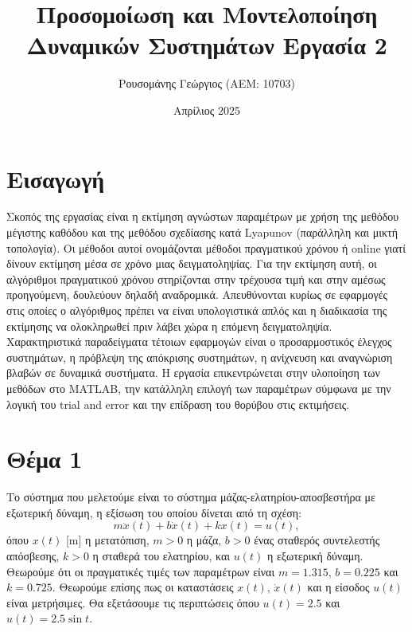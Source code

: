 \documentclass[a4paper,12pt]{article}
\title{Προσομοίωση και Μοντελοποίηση \newline Δυναμικών Συστημάτων \newline Εργασία 2}
\author{Ρουσομάνης Γεώργιος (ΑΕΜ: 10703)}
\date{Απρίλιος 2025}
\begin{document}
\maketitle

\section*{Εισαγωγή}
Σκοπός της εργασίας είναι η εκτίμηση αγνώστων παραμέτρων με χρήση της μεθόδου μέγιστης καθόδου και της 
μεθόδου σχεδίασης κατά Lyapunov (παράλληλη και μικτή τοπολογία).
Οι μέθοδοι αυτοί ονομάζονται μέθοδοι πραγματικού χρόνου ή online
γιατί δίνουν εκτίμηση μέσα σε χρόνο μιας δειγματοληψίας. Για την εκτίμηση αυτή, οι αλγόριθμοι πραγματικού 
χρόνου στηρίζονται στην τρέχουσα τιμή και στην αμέσως προηγούμενη, δουλεύουν δηλαδή αναδρομικά. Απευθύνονται
κυρίως σε εφαρμογές στις οποίες ο αλγόριθμος πρέπει να είναι υπολογιστικά απλός και η διαδικασία της εκτίμησης 
να ολοκληρωθεί πριν λάβει χώρα η επόμενη δειγματοληψία. Χαρακτηριστικά παραδείγματα τέτοιων εφαρμογών είναι ο 
προσαρμοστικός έλεγχος συστημάτων, η πρόβλεψη της απόκρισης συστημάτων, η ανίχνευση και αναγνώριση βλαβών σε 
δυναμικά συστήματα. Η εργασία επικεντρώνεται στην υλοποίηση των μεθόδων στο 
MATLAB, την κατάλληλη επιλογή των παραμέτρων σύμφωνα με την 
λογική του trial and error και την επίδραση του θορύβου στις
εκτιμήσεις.

\section*{Θέμα 1}
Το σύστημα που μελετούμε είναι το σύστημα μάζας-ελατηρίου-αποσβεστήρα με εξωτερική δύναμη, η εξίσωση του
οποίου δίνεται από τη σχέση:
\begin{equation}
    m \ddot{x}(t) + b \dot{x}(t) + k x(t) = u(t),
    \label{eq:system_ODE}
\end{equation}
όπου $x(t)$ [m] η μετατόπιση, $m>0$ η μάζα, $b>0$ ένας σταθερός 
συντελεστής απόσβεσης, $k>0$ η σταθερά του ελατηρίου, και $u(t)$ η εξωτερική δύναμη. Θεωρούμε ότι οι πραγματικές
τιμές των παραμέτρων είναι $m=1.315$, $b=0.225$ και $k=0.725$. Θεωρούμε επίσης πως οι καταστάσεις $x(t)$, 
$\dot{x}(t)$ και η είσοδος $u(t)$ είναι μετρήσιμες. Θα εξετάσουμε τις περιπτώσεις όπου $u(t) = 2.5$ και 
$u(t) = 2.5\sin t$.
\end{document}
